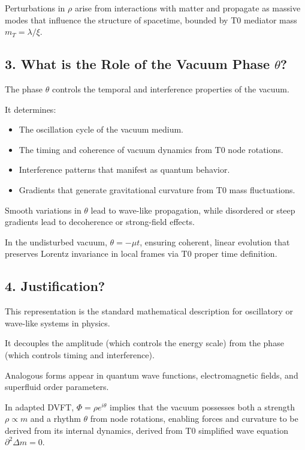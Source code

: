 \documentclass[12pt,a4paper]{article}
\begin{document}
	Perturbations in $\rho$ arise from interactions with matter and propagate as massive modes that influence the structure of spacetime, bounded by T0 mediator mass $m_T = \lambda / \xi$.
	
	\subsection{3. What is the Role of the Vacuum Phase $\theta$?}
	
	The phase $\theta$ controls the temporal and interference properties of the vacuum.
	
	It determines:
	\begin{itemize}
		\item The oscillation cycle of the vacuum medium.
		\item The timing and coherence of vacuum dynamics from T0 node rotations.
		\item Interference patterns that manifest as quantum behavior.
		\item Gradients that generate gravitational curvature from T0 mass fluctuations.
	\end{itemize}
	
	Smooth variations in $\theta$ lead to wave-like propagation, while disordered or steep gradients lead to decoherence or strong-field effects.
	
	In the undisturbed vacuum, $\theta = -\mu t$, ensuring coherent, linear evolution that preserves Lorentz invariance in local frames via T0 proper time definition.
	
	\subsection{4. Justification?}
	
	This representation is the standard mathematical description for oscillatory or wave-like systems in physics.
	
	It decouples the amplitude (which controls the energy scale) from the phase (which controls timing and interference).
	
	Analogous forms appear in quantum wave functions, electromagnetic fields, and superfluid order parameters.
	
	In adapted DVFT, $\Phi = \rho e^{i\theta}$ implies that the vacuum possesses both a strength $\rho \propto m$ and a rhythm $\theta$ from node rotations, enabling forces and curvature to be derived from its internal dynamics, derived from T0 simplified wave equation $\partial^2 \Delta m = 0$.
	
\end{document}
